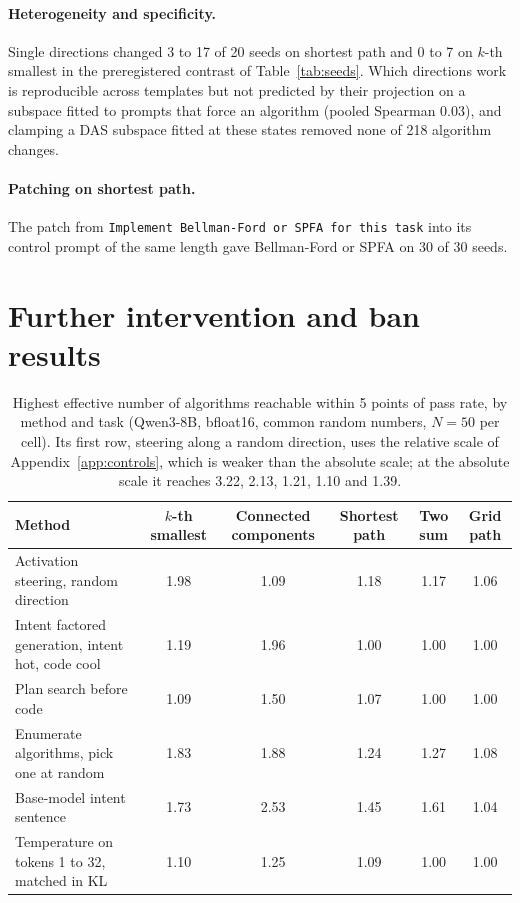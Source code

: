 \documentclass[11pt,letterpaper]{article}
\begin{document}
\paragraph{Heterogeneity and specificity.} Single directions changed 3 to 17 of 20 seeds on shortest path and 0 to 7 on $k$-th smallest in the preregistered contrast of Table~\ref{tab:seeds}. Which directions work is reproducible across templates but not predicted by their projection on a subspace fitted to prompts that force an algorithm (pooled Spearman 0.03), and clamping a DAS subspace fitted at these states removed none of 218 algorithm changes.

\paragraph{Patching on shortest path.} The patch from \texttt{Implement Bellman-Ford or SPFA for this task} into its control prompt of the same length gave Bellman-Ford or SPFA on 30 of 30 seeds.

\section{Further intervention and ban results}
\label{app:knobs}

\begin{table}[!htbp]
\centering
\footnotesize
\caption{Highest effective number of algorithms reachable within 5 points of pass rate, by method and task (Qwen3-8B, bfloat16, common random numbers, $N = 50$ per cell). Its first row, steering along a random direction, uses the relative scale of Appendix~\ref{app:controls}, which is weaker than the absolute scale; at the absolute scale it reaches 3.22, 2.13, 1.21, 1.10 and 1.39.}
\label{tab:knobs}
\begin{tabularx}{\linewidth}{@{}Yccccc@{}}
\toprule
Method & $k$-th smallest & Connected components & Shortest path & Two sum & Grid path \\
\midrule
Activation steering, random direction & 1.98 & 1.09 & 1.18 & 1.17 & 1.06 \\
Intent factored generation, intent hot, code cool & 1.19 & 1.96 & 1.00 & 1.00 & 1.00 \\
Plan search before code & 1.09 & 1.50 & 1.07 & 1.00 & 1.00 \\
Enumerate algorithms, pick one at random & 1.83 & 1.88 & 1.24 & 1.27 & 1.08 \\
Base-model intent sentence & 1.73 & 2.53 & 1.45 & 1.61 & 1.04 \\
Temperature on tokens 1 to 32, matched in KL & 1.10 & 1.25 & 1.09 & 1.00 & 1.00 \\
\bottomrule
\end{tabularx}
\end{table}
\end{document}
